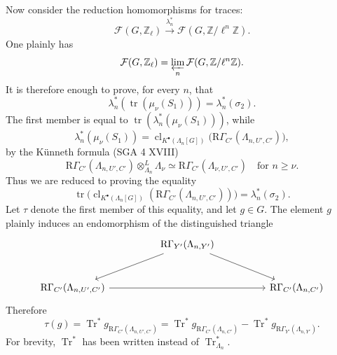 \documentclass[11pt]{article}
\providecommand{\Tr}{\operatorname{Tr}}
\providecommand{\Tr}{\operatorname{Tr}}
\providecommand{\Tr}{\operatorname{Tr}}
\providecommand{\Tr}{\operatorname{Tr}}
\providecommand{\clKstar}[1]{\operatorname{cl}_{K^{\bullet}(#1)}}
\providecommand{\RG}{\mathrm R\Gamma}
\providecommand{\Tr}{\operatorname{Tr}}
\begin{document}
Now consider the reduction homomorphisms for traces:
\[
\mathcal F(G,\mathbb Z_\ell)\xrightarrow{\lambda_n^*}\mathcal F(G,\mathbb Z/\ell^n\mathbb Z).
\]
One plainly has
\[
\mathcal F(G,\mathbb Z_\ell)=\varprojlim_n\mathcal F(G,\mathbb Z/\ell^n\mathbb Z).
\]
It is therefore enough to prove, for every $n$, that
\[
\lambda_n^*(\operatorname{tr}(\mu_\nu(S_1)))=\lambda_n^*(\sigma_2).
\]
The first member is equal to $\operatorname{tr}(\lambda_n^*(\mu_\nu(S_1)))$, while
\[
\lambda_n^*(\mu_\nu(S_1))
=
\clKstar{\Lambda_n[G]}\bigl(\RG_{C'}(\Lambda_{n,U',C'})\bigr),
\]
by the Künneth formula (SGA 4 XVIII)
\[
\RG_{C'}(\Lambda_{n,U',C'})\otimes_{\Lambda_n}^{L}\Lambda_\nu
\simeq \RG_{C'}(\Lambda_{\nu,U',C'})
\quad\text{for } n\ge\nu.
\]
Thus we are reduced to proving the equality
\[
\operatorname{tr}\bigl(\clKstar{\Lambda_n[G]}(\RG_{C'}(\Lambda_{n,U',C'}))\bigr)
=
\lambda_n^*(\sigma_2).
\]
Let $\tau$ denote the first member of this equality, and let $g\in G$. The element $g$ plainly induces an endomorphism of the distinguished triangle
\[
\begin{tikzcd}[column sep=huge,row sep=large]
& \RG_{Y'}(\Lambda_{n,Y'}) \arrow[dl] \arrow[dr] & \\
\RG_{C'}(\Lambda_{n,U',C'}) \arrow[rr] && \RG_{C'}(\Lambda_{n,C'})
\end{tikzcd}
\]
Therefore
\[
\tau(g)=\Tr^*g_{\RG_{C'}(\Lambda_{n,U',C'})}
=\Tr^*g_{\RG_{C'}(\Lambda_{n,C'})}
-\Tr^*g_{\RG_{Y'}(\Lambda_{n,Y'})}.
\]
For brevity, $\Tr^*$ has been written instead of $\Tr^*_{\Lambda_n}$.
\end{document}
